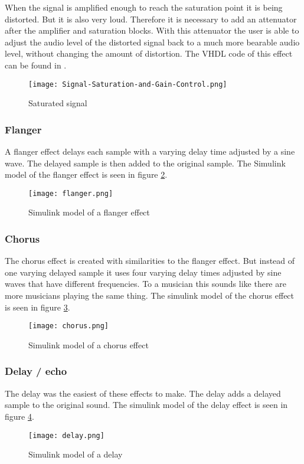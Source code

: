 When the signal is amplified enough to reach the saturation point it is being distorted. But it is also very loud. Therefore it is necessary to add an attenuator after the amplifier and saturation blocks. With this attenuator the user is able to adjust the audio level of the distorted signal back to a much more bearable audio level, without changing the amount of distortion. The VHDL code of this effect can be found in \nameref{}.

\begin{figure}[ht]
    \texttt{[image: Signal-Saturation-and-Gain-Control.png]}
    \caption{Saturated signal}
    \label{fig:saturated_signal}
\end{figure}

\subsubsection{Flanger}
A flanger effect delays each sample with a varying delay time adjusted by a sine wave. The delayed sample is then added to the original sample. The Simulink model of the flanger effect is seen in figure \ref{fig:flangersimulink}.

\begin{figure}[ht]
    \texttt{[image: flanger.png]}
    \caption{Simulink model of a flanger effect}
    \label{fig:flangersimulink}
\end{figure}

\subsubsection{Chorus}
The chorus effect is created with similarities to the flanger effect. But instead of one varying delayed sample it uses four varying delay times adjusted by sine waves that have different frequencies. To a musician this sounds like there are more musicians playing the same thing. The simulink model of the chorus effect is seen in figure \ref{fig:chorussimulink}.

\begin{figure}[ht]
    \texttt{[image: chorus.png]}
    \caption{Simulink model of a chorus effect}
    \label{fig:chorussimulink}
\end{figure}

\subsubsection{Delay / echo}
The delay was the easiest of these effects to make. The delay adds a delayed sample to the original sound. The simulink model of the delay effect is seen in figure \ref{fig:delaysimulink}.

\begin{figure}[ht]
    \texttt{[image: delay.png]}
    \caption{Simulink model of a delay}
    \label{fig:delaysimulink}
\end{figure}

